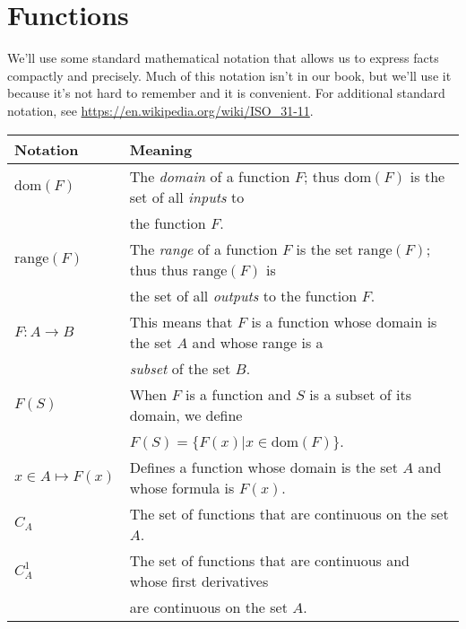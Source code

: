 \documentclass[12pt]{article}
\newcommand{\dom}{\mathrm{dom}}
\newcommand{\range}{\mathrm{range}}
\begin{document}
\section*{Functions}

We'll use some standard mathematical notation that allows us to express facts compactly and precisely.  Much of this notation isn't in our book, but
we'll use it because it's not hard to remember and it is convenient. For additional standard notation, see \url{https://en.wikipedia.org/wiki/ISO_31-11}.

\vspace{0.1in}

\begin{tabular}{|l | l |} \hline 
\textbf{Notation}& \textbf{Meaning} \\ \hline
    $\dom(F)$  &  The \emph{domain} of a function $F$;   thus $\dom(F)$  is the set of all \emph{inputs} to \\
                         & the function $F$. \\  \hline
    
    $\range(F)$  & The \emph{range} of a function   $F$ is the set $\range(F)$; thus    thus $\range(F) $ is  \\
                          & the set of all \emph{outputs} to the function $F$.\\ \hline
                          
   $F : A \to B$ & This means that $F$ is a function whose domain is   the set $A$ and whose range is a \\
                           & \emph{subset} of the set $B$. \\ \hline        
                           
   $F(S)$     & When $F$ is a function and $S$ is a subset of its domain, we define \\
                    &   \( F(S) = \{F(x) |  x \in \dom(F) \}  \).\\ \hline                                    
                          
 $ x \in A \mapsto F(x)$  & Defines a function whose domain is the set $A$ and whose formula is $ F(x)$. \\  \hline
 
$  C_A $ &  The set of functions that are continuous on the set $A$. \\  \hline

$ C_A^1$  &  The set of functions that are continuous and whose first derivatives \\ 
                   &       are continuous on the set $A$. \\  \hline


\end{tabular}
\end{document}
